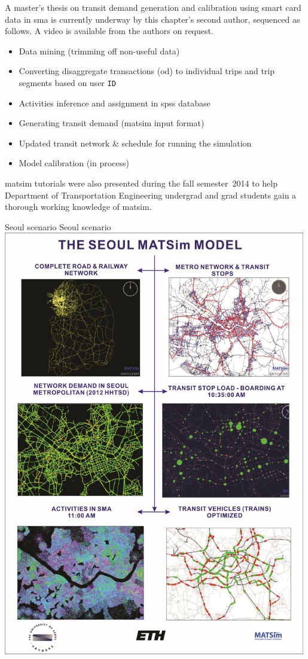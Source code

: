 A master's thesis on transit demand generation and calibration using smart card data in \gls{sma} is currently underway by this chapter's second author, sequenced as follows. A video is available from the authors on request.
%
\begin{itemize}\styleItemize
\item Data mining (trimming off non-useful data)
\item	Converting disaggregate transactions (\gls{od}) to individual trips and trip segments based on user \lstinline|ID|
\item	Activities inference and assignment in \gls{spss} database
\item	Generating transit demand (\gls{matsim} input format)
\item	Updated transit network \& schedule for running the simulation
\item	Model calibration (in process)
\end{itemize}
%
\gls{matsim} tutorials were also presented during the fall semester~2014 to help Department of Transportation Engineering undergrad and grad students gain a thorough working knowledge of \gls{matsim}.

\createfigure%
{Seoul scenario}%
{Seoul scenario}%
{\label{fig:seoul}}%
{\includegraphics[width=0.99\textwidth, angle=0]{scenarios/figures/seoul}}%
{}

 
 
